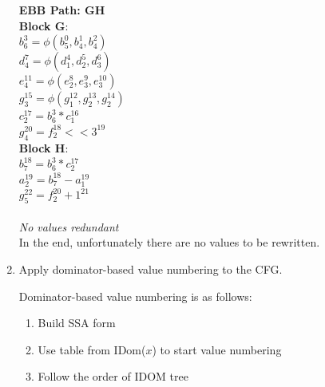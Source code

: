 \documentclass[11pt]{article}
\begin{document}
\begin{enumerate}
\begin{Answer}
		      \textbf{EBB Path: GH} \\
		      \textbf{Block G}: \\
		      $b_6^3 = \phi(b_5^0, b_4^1, b_4^2)$ \\
		      $d_4^7 = \phi(d_1^4, d_2^5, d_3^6)$ \\
		      $e_4^{11} = \phi(e_2^8, e_3^9, e_3^{10})$ \\
		      $g_3^{15} = \phi(g_1^{12}, g_2^{13}, g_2^{14})$ \\
		      $c_2^{17} = b_6^3 * c_1^{16}$ \\
		      $g_4^{20} = f_2^{18} << 3^{19}$ \\
		      \textbf{Block H}: \\
		      $b_7^{18} = b_6^3 * c_2^{17}$ \\
		      $a_2^{19} = b_7^{18} - a_1^{19}$ \\
		      $g_5^{22} = f_2^{20} + 1^{21}$ \\
		      \\
		      \textit{No values redundant} \\

		      In the end, unfortunately there are no values to be rewritten.
	      \end{Answer}
	\item Apply dominator-based value numbering to the CFG.
	      \begin{Answer}
		      Dominator-based value numbering is as follows:
		      \begin{enumerate}[i]
			      \item Build SSA form
			      \item Use table from IDom($x$) to start value numbering
			      \item Follow the order of IDOM tree
		      \end{enumerate}


\end{Answer}
\end{enumerate}
\end{document}
